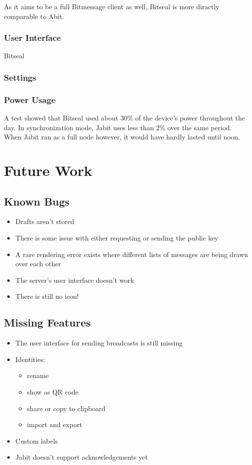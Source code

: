 \documentclass{bfh}
\begin{document}
  As it aims to be a full Bitmessage client as well, Bitseal is more diractly comparable to Abit.

  \subsubsection{User Interface}
  Bitseal 

  \subsubsection{Settings}
  \subsubsection{Power Usage}
  A test showed that Bitseal used about 30\% of the device's power throughout the day. In synchronization mode, Jabit uses less than 2\% over the same period. When Jabit ran as a full node however, it would have hardly lasted until noon.


  \newpage
  \section{Future Work}
  \subsection{Known Bugs}
  \begin{itemize}
    \item Drafts aren't stored
    \item There is some issue with either requesting or sending the public key
    \item A rare rendering error exists where different lists of messages are being drawn over each other
    \item The server's user interface doesn't work
    \item There is still no icon!
  \end{itemize}

  \subsection{Missing Features}
  \begin{itemize}
    \item The user interface for sending broadcasts is still missing
    \item Identities:
      \begin{itemize}
        \item rename
        \item show as QR code
        \item share or copy to clipboard
        \item import and export
      \end{itemize}
    \item Custom labels
    \item Jabit doesn't support acknowledgements yet
  \end{itemize}
\end{document}
